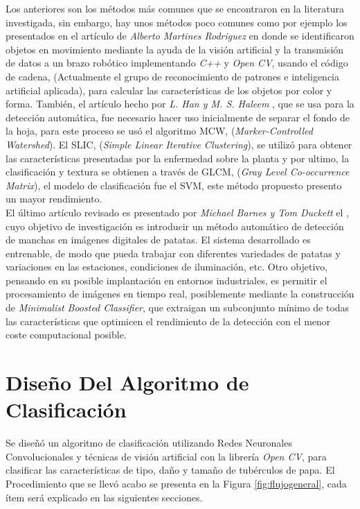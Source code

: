 	Los anteriores son los métodos más comunes que se encontraron en la literatura investigada, sin embargo, hay unos métodos poco comunes como por ejemplo los presentados en el artículo de \textit{Alberto Martines Rodriguez} \cite{article5} en donde se identificaron objetos en movimiento mediante la ayuda de la visión artificial y la transmisión de datos a un brazo robótico implementando \textit{C++} y \textit{Open CV}, usando el código de cadena, (Actualmente el grupo de reconocimiento de patrones e inteligencia artificial aplicada), para calcular las características de los objetos por color y forma. También, el artículo hecho por \textit{L. Han y M. S. Haleem} \cite{7237209}, que se usa para la detección automática, fue necesario hacer uso inicialmente de separar el fondo de la hoja, para este proceso se usó el algoritmo MCW, (\textit{Marker-Controlled Watershed}). El SLIC, (\textit{Simple Linear Iterative Clustering}), se utilizó para obtener las características presentadas por la enfermedad sobre la planta y por ultimo, la clasificación y textura se obtienen a través de GLCM, (\textit{Gray Level Co-occurrence Matrix}), el modelo de clasificación fue el SVM, este método propuesto presento un mayor rendimiento.\\
	
	El último artículo revisado es presentado por \textit{Michael Barnes y Tom Duckett} el \cite{Barnes2010}, cuyo objetivo de  investigación es introducir un método automático de detección de manchas en imágenes digitales de patatas. El sistema desarrollado es entrenable, de modo que pueda trabajar con diferentes variedades de patatas y variaciones en las estaciones, condiciones de iluminación, etc. Otro objetivo, pensando en su posible implantación en entornos industriales, es permitir el procesamiento de imágenes en tiempo real, posiblemente mediante la construcción de \textit{Minimalist Boosted Classifier}, que extraigan un subconjunto mínimo de todas las características que optimicen el rendimiento de la detección con el menor coste computacional posible.





\chapter{Diseño Del Algoritmo de Clasificación}


Se diseñó un algoritmo de clasificación utilizando Redes Neuronales Convolucionales y técnicas de visión artificial con la librería \textit{Open CV}, para clasificar las características de tipo, daño y tamaño de tubérculos de papa. El Procedimiento que se llevó acabo se presenta en la Figura \ref{fig:flujogeneral}, cada ítem será explicado en las siguientes secciones. 


